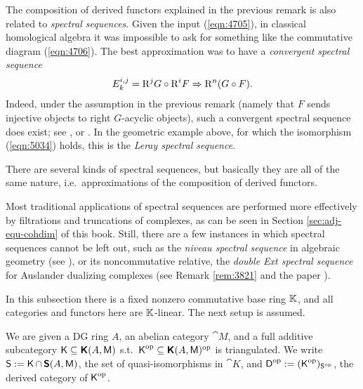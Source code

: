 \begin{rem} \label{rem:4705}
The composition of derived functors explained in the previous remark is also 
related to {\em spectral sequences}.
Given the input (\ref{eqn:4705}), in classical homological algebra it was 
impossible to ask for something like the commutative diagram (\ref{eqn:4706}).
The best approximation was to have a {\em convergent spectral sequence}
\begin{equation} \label{eqn:4695}
E^{i, j}_k = \mathrm{R}^j G \circ \mathrm{R}^i F \Rightarrow
\mathrm{R}^n (G \circ F) . 
\end{equation}
Indeed, under the assumption in the previous remark (namely that
$F$ sends injective objects to right $G$-acyclic objects), such a convergent 
spectral sequence does exist; see   
\cite[Chapters XI-XII]{Mac1}, \cite[Section 11]{Rot} or 
\cite[Section 5.7]{We}. In the geometric example above, for which the 
isomorphism (\ref{eqn:5034}) holds, this is the {\em Leray spectral 
sequence}.  

There are several kinds of spectral sequences, but basically they are all of the 
same nature, i.e.\ approximations of the composition of derived functors. 

Most traditional applications of spectral sequences are performed more 
effectively by filtrations and truncations of complexes, as can be seen in 
Section \ref{sec:adj-equ-cohdim} of this book.
Still, there are a few instances in which spectral sequences 
cannot be left out, such as the {\em niveau spectral sequence} in algebraic 
geometry (see \cite[Chapter IV]{RD}), or its noncommutative relative, the {\em 
double Ext spectral sequence} for Auslander dualizing complexes 
(see Remark \ref{rem:3821} and the paper \cite{YeZh1}).  
\end{rem}



\label{subsec:cntr-tri-der-funs}

In this subsection there is a fixed nonzero commutative base ring $\mathbb{K}$, and 
all categories and functors here are $\mathbb{K}$-linear. The next setup is assumed. 

\begin{setup} \label{set:3225}
We are given a DG ring $A$, an abelian category
$\cat{M}$, and a full additive subcategory
$\operatorname{\mathsf{K}} \subseteq \boldsymbol{\mathsf{K}}(A, \operatorname{\mathsf{M}})$ s.t.\ 
$\operatorname{\mathsf{K}}^{\mathrm{op}} \subseteq \boldsymbol{\mathsf{K}}(A, \operatorname{\mathsf{M}})^{\mathrm{op}}$
is triangulated. We write 
$\operatorname{\mathsf{S}} := \operatorname{\mathsf{K}} \cap \, \boldsymbol{\mathsf{S}}(A, \operatorname{\mathsf{M}})$, 
the set of quasi-isomorphisms in $\cat{K}$, and 
$\operatorname{\mathsf{D}}^{\mathrm{op}} := (\operatorname{\mathsf{K}}^{\mathrm{op}})_{\operatorname{\mathsf{S}}^{\mathrm{op}}}$,
the derived category of $\operatorname{\mathsf{K}}^{\mathrm{op}}$. 
\end{setup}

